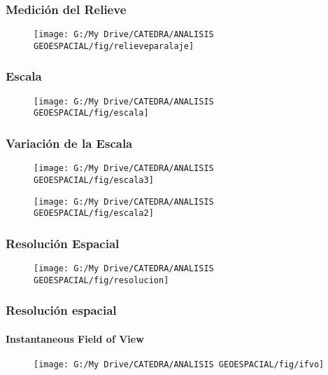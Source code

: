 \documentclass[14pt]{beamer}
\begin{document}
\begin{frame}
\frametitle{Medición del Relieve}
 \begin{figure}
    \centering
    \texttt{[image: G:/My Drive/CATEDRA/ANALISIS GEOESPACIAL/fig/relieveparalaje]}
  \end{figure}
\end{frame}
\begin{frame}
\frametitle{Escala}
 \begin{figure}
    \centering
    \texttt{[image: G:/My Drive/CATEDRA/ANALISIS GEOESPACIAL/fig/escala]}
  \end{figure}
\end{frame}
\begin{frame}
\frametitle{Variación de la Escala}
 \begin{figure}
    \centering
    \texttt{[image: G:/My Drive/CATEDRA/ANALISIS GEOESPACIAL/fig/escala3]}
  \end{figure}
\end{frame}
\begin{frame}
 \begin{figure}
    \centering
    \texttt{[image: G:/My Drive/CATEDRA/ANALISIS GEOESPACIAL/fig/escala2]}
  \end{figure}
\end{frame}
\begin{frame}
\frametitle{Resolución Espacial}
 \begin{figure}
    \centering
    \texttt{[image: G:/My Drive/CATEDRA/ANALISIS GEOESPACIAL/fig/resolucion]}
  \end{figure}
\end{frame}
\begin{frame}
\frametitle{Resolución espacial}
\framesubtitle{Instantaneous Field of View}
 \begin{figure}
    \centering
    \texttt{[image: G:/My Drive/CATEDRA/ANALISIS GEOESPACIAL/fig/ifvo]}
  \end{figure}
\end{frame}
\end{document}
